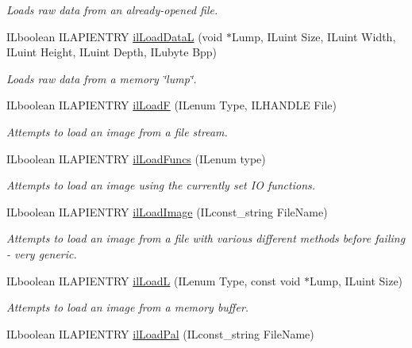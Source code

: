 \begin{DoxyCompactItemize}
\begin{DoxyCompactList}\small\item\em Loads raw data from an already-\/opened file. \end{DoxyCompactList}\item 
\hypertarget{group__file_gacee512181ef7d072d25862eace4fe568}{I\+Lboolean I\+L\+A\+P\+I\+E\+N\+T\+R\+Y \hyperlink{group__file_gacee512181ef7d072d25862eace4fe568}{il\+Load\+Data\+L} (void $\ast$Lump, I\+Luint Size, I\+Luint Width, I\+Luint Height, I\+Luint Depth, I\+Lubyte Bpp)}\label{group__file_gacee512181ef7d072d25862eace4fe568}

\begin{DoxyCompactList}\small\item\em Loads raw data from a memory \char`\"{}lump\char`\"{}. \end{DoxyCompactList}\item 
I\+Lboolean I\+L\+A\+P\+I\+E\+N\+T\+R\+Y \hyperlink{group__file_gaf4026be626ce1e62d6867ccee4afb607}{il\+Load\+F} (I\+Lenum Type, I\+L\+H\+A\+N\+D\+L\+E File)
\begin{DoxyCompactList}\small\item\em Attempts to load an image from a file stream. \end{DoxyCompactList}\item 
I\+Lboolean I\+L\+A\+P\+I\+E\+N\+T\+R\+Y \hyperlink{group__file_ga156c262317e404e53df7454a064973a3}{il\+Load\+Funcs} (I\+Lenum type)
\begin{DoxyCompactList}\small\item\em Attempts to load an image using the currently set I\+O functions. \end{DoxyCompactList}\item 
I\+Lboolean I\+L\+A\+P\+I\+E\+N\+T\+R\+Y \hyperlink{group__file_gace0d235c26455aa9ebe091b0af019a8f}{il\+Load\+Image} (I\+Lconst\+\_\+string File\+Name)
\begin{DoxyCompactList}\small\item\em Attempts to load an image from a file with various different methods before failing -\/ very generic. \end{DoxyCompactList}\item 
I\+Lboolean I\+L\+A\+P\+I\+E\+N\+T\+R\+Y \hyperlink{group__file_ga0417a8c1202ae4720d98b0fe3ecddfda}{il\+Load\+L} (I\+Lenum Type, const void $\ast$Lump, I\+Luint Size)
\begin{DoxyCompactList}\small\item\em Attempts to load an image from a memory buffer. \end{DoxyCompactList}\item 
\hypertarget{group__file_gac412222fcdd3ae96b1d9de01c8e17a5a}{I\+Lboolean I\+L\+A\+P\+I\+E\+N\+T\+R\+Y \hyperlink{group__file_gac412222fcdd3ae96b1d9de01c8e17a5a}{il\+Load\+Pal} (I\+Lconst\+\_\+string File\+Name)}\label{group__file_gac412222fcdd3ae96b1d9de01c8e17a5a}


\end{DoxyCompactItemize}
